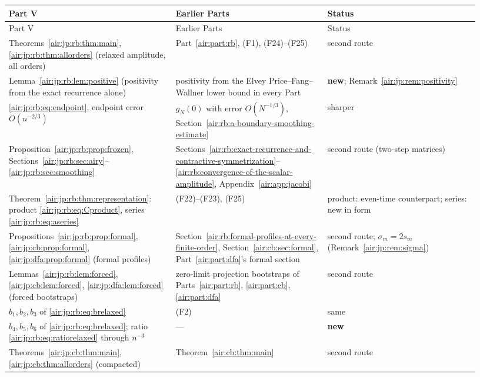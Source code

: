 \documentclass[11pt,letterpaper]{article}
\numberwithin{equation}{section}
\theoremstyle{remark}
\begin{document}
{\small
\begin{longtable}{@{}>{\raggedright\arraybackslash}p{0.33\linewidth}>{\raggedright\arraybackslash}p{0.3\linewidth}>{\raggedright\arraybackslash}p{0.3\linewidth}@{}}
\toprule
Part V & Earlier Parts & Status\\
\midrule
\endfirsthead
\toprule
Part V & Earlier Parts & Status\\
\midrule
\endhead
\bottomrule
\endfoot
Theorems~\ref{air:jp:rb:thm:main}, \ref{air:jp:rb:thm:allorders} (relaxed amplitude, all orders) & Part~\ref{air:part:rb}, (F1), (F24)--(F25) & second route\\
Lemma~\ref{air:jp:rb:lem:positive} (positivity from the exact recurrence alone) & positivity from the Elvey Price--Fang--Wallner lower bound in every Part & \textbf{new}; Remark~\ref{air:jp:rem:positivity}\\
\eqref{air:jp:rb:eq:endpoint}, endpoint error $O(n^{-2/3})$ & $g_N(0)$ with error $O(N^{-1/3})$, Section~\ref{air:rb:a-boundary-smoothing-estimate} & sharper\\
Proposition~\ref{air:jp:rb:prop:frozen}, Sections~\ref{air:jp:rb:sec:airy}--\ref{air:jp:rb:sec:smoothing} & Sections~\ref{air:rb:exact-recurrence-and-contractive-symmetrization}--\ref{air:rb:convergence-of-the-scalar-amplitude}, Appendix~\ref{air:app:jacobi} & second route (two-step matrices)\\
Theorem~\ref{air:jp:rb:thm:representation}: product \eqref{air:jp:rb:eq:Cproduct}, series \eqref{air:jp:rb:eq:aseries} & (F22)--(F23), (F25) & product: even-time counterpart; series: new in form\\
Propositions~\ref{air:jp:rb:prop:formal}, \ref{air:jp:cb:prop:formal}, \ref{air:jp:dfa:prop:formal} (formal profiles) & Section~\ref{air:rb:formal-profiles-at-every-finite-order}, Section~\ref{air:cb:sec:formal}, Part~\ref{air:part:dfa}'s formal section & second route; $\sigma_m=2s_m$ (Remark~\ref{air:jp:rem:sigma})\\
Lemmas~\ref{air:jp:rb:lem:forced}, \ref{air:jp:cb:lem:forced}, \ref{air:jp:dfa:lem:forced} (forced bootstraps) & zero-limit projection bootstraps of Parts~\ref{air:part:rb}, \ref{air:part:cb}, \ref{air:part:dfa} & second route\\
$b_1,b_2,b_3$ of \eqref{air:jp:rb:eq:brelaxed} & (F2) & same\\
$b_4,b_5,b_6$ of \eqref{air:jp:rb:eq:brelaxed}; ratio \eqref{air:jp:rb:eq:ratiorelaxed} through $n^{-3}$ & --- & \textbf{new}\\
Theorems~\ref{air:jp:cb:thm:main}, \ref{air:jp:cb:thm:allorders} (compacted) & Theorem~\ref{air:cb:thm:main} & second route\\

\end{longtable}}
\end{document}
